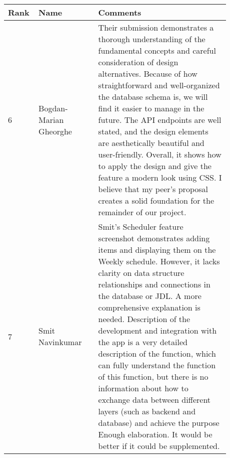 \documentclass[a4paper]{article}
\begin{document}
 {\noindent\begin{tabular}{|p{0.075\linewidth}|p{0.25\linewidth}|p{0.55\linewidth}|} 
	\hline
 \textbf{Rank} & \textbf{Name} & \textbf{Comments} \\
 \hline
 6 & Bogdan-Marian Gheorghe & Their submission demonstrates a thorough understanding of the fundamental concepts and careful consideration of design alternatives. Because of how straightforward and well-organized the database schema is, we will find it easier to manage in the future. The API endpoints are well stated, and the design elements are aesthetically beautiful and user-friendly. Overall, it shows how to apply the design and give the feature a modern look using CSS. I believe that my peer's proposal creates a solid foundation for the remainder of our project.\\
 \hline
 7 & Smit Navinkumar & Smit's Scheduler feature screenshot demonstrates adding items and displaying them on the Weekly schedule. However, it lacks clarity on data structure relationships and connections in the database or JDL. A more comprehensive explanation is needed.
 Description of the development and integration with the app is a very detailed description of the function, which can fully understand the function of this function, but there is no information about how to exchange data between different layers (such as backend and database) and achieve the purpose Enough elaboration. It would be better if it could be supplemented.\\
 \hline
\end{tabular}}
\end{document}
